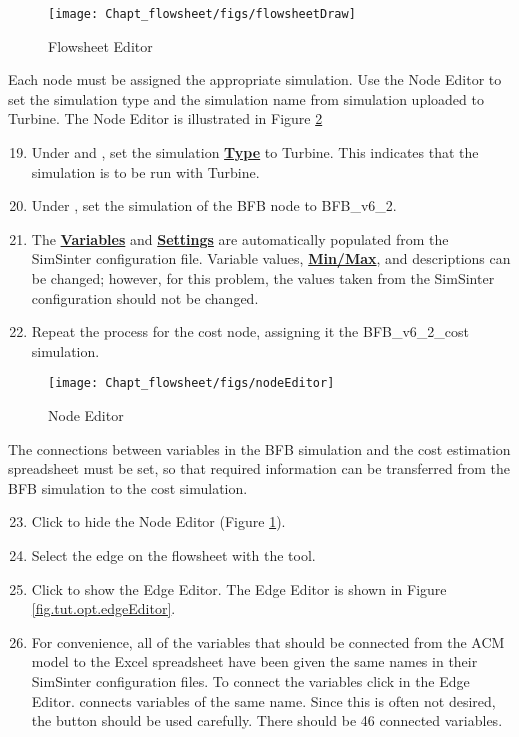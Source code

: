 \begin{figure}[H]
	\begin{center}
		\texttt{[image: Chapt\_flowsheet/figs/flowsheetDraw]}
		\caption{Flowsheet Editor}
		\label{fig.tut.opt.drawFlowsheet}
	\end{center}
\end{figure}
Each node must be assigned the appropriate simulation. Use the Node Editor to set the simulation type and the simulation name from simulation uploaded to Turbine. The Node Editor is illustrated in Figure \ref{fig.tut.opt.nodeEditor}
\begin{enumerate}
	\setcounter{enumi}{18}
	\item Under  and , set the simulation \textbf{\underline{Type}} to Turbine. This indicates that the simulation is to be run with Turbine.
	\item Under , set the simulation of the BFB node to BFB\_v6\_2.
	\item The \textbf{\underline{Variables}} and \textbf{\underline{Settings}} are automatically populated from the SimSinter configuration file. Variable values, \textbf\underline{{Min/Max}}, and descriptions can be changed; however, for this problem, the values taken from the SimSinter configuration should not be changed.
	\item Repeat the process for the cost node, assigning it the BFB\_v6\_2\_cost simulation.
\end{enumerate}
\begin{figure}[H] 
	\begin{center} 
		\texttt{[image: Chapt\_flowsheet/figs/nodeEditor]}
		\caption{Node Editor}
		\label{fig.tut.opt.nodeEditor}
	\end{center}
\end{figure}
The connections between variables in the BFB simulation and the cost estimation spreadsheet must be set, so that required information can be transferred from the BFB simulation to the cost simulation.

\begin{enumerate}
	\setcounter{enumi}{22}
	\item Click  to hide the Node Editor (Figure \ref{fig.tut.opt.drawFlowsheet}).
	\item Select the edge on the flowsheet with the  tool.
	\item Click  to show the Edge Editor. The Edge Editor is shown in Figure \ref{fig.tut.opt.edgeEditor}.
	\item For convenience, all of the variables that should be connected from the ACM model to the Excel spreadsheet have been given the same names in their SimSinter configuration files. To connect the variables click  in the Edge Editor.   connects variables of the same name. Since this is often not desired, the  button should be used carefully. There should be 46 connected variables.
\end{enumerate}

